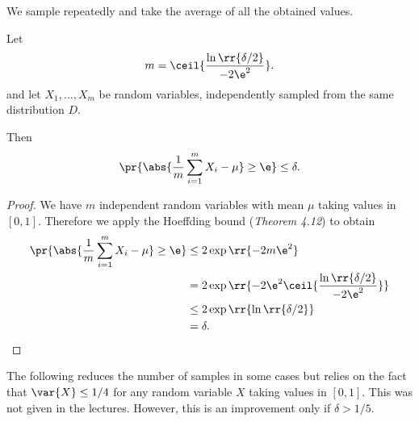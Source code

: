 \documentclass{article}
\begin{document}
We sample repeatedly and take the average of all the obtained values.

\begin{claim*}
  Let
  \begin{align*}
    m = \ceil{\frac{\ln\rr{\delta/2}}{-2\e^2}}.
  \end{align*}
  and let $X_1,...,X_m$ be random variables, independently sampled from the same distribution $D$.

  Then
  \begin{align*}
    \pr{\abs{\frac{1}{m}\sum_{i=1}^{m} X_i - \mu}\geq\e}\leq\delta.
  \end{align*}

  \begin{proof}
    We have $m$ independent random variables with mean $\mu$ taking values in $[0,1]$.
    Therefore we apply the Hoeffding bound (\emph{Theorem 4.12}) to obtain
    \begin{align*}
      \pr{\abs{\frac{1}{m}\sum_{i=1}^{m} X_i - \mu}\geq\e}&\leq 2\exp\rr{-2m\e^2} \\
                                                          &= 2\exp\rr{-2\e^2\ceil{\frac{\ln\rr{\delta/2}}{-2\e^2}}}\\
                                                          &\leq 2\exp\rr{{\ln\rr{\delta/2}}} \\ &
                                                          = \delta.
    \end{align*}
  \end{proof}
\end{claim*}

The following reduces the number of samples in some cases but relies on the fact that
$\var{X}\leq 1/4$ for any random variable $X$ taking values in $[0,1]$. This was not
given in the lectures. However, this is an improvement only if $\delta>1/5$.
\end{document}
